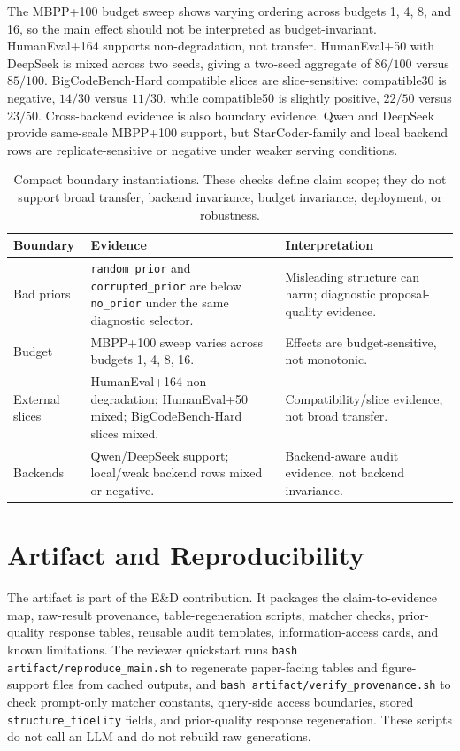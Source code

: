 \documentclass{article}
\newcommand{\code}[1]{\texttt{#1}}
\begin{document}
The MBPP+100 budget sweep shows varying ordering across budgets 1, 4, 8, and 16, so the main effect should not be interpreted as budget-invariant. HumanEval+164 supports non-degradation, not transfer. HumanEval+50 with DeepSeek is mixed across two seeds, giving a two-seed aggregate of $86/100$ versus $85/100$. BigCodeBench-Hard compatible slices are slice-sensitive: compatible30 is negative, $14/30$ versus $11/30$, while compatible50 is slightly positive, $22/50$ versus $23/50$. Cross-backend evidence is also boundary evidence. Qwen and DeepSeek provide same-scale MBPP+100 support, but StarCoder-family and local backend rows are replicate-sensitive or negative under weaker serving conditions.

\begin{table}[H]
\caption{Compact boundary instantiations. These checks define claim scope; they do not support broad transfer, backend invariance, budget invariance, deployment, or robustness.}
\label{tab:boundaries}
\centering
\footnotesize
\begin{tabularx}{\linewidth}{l Y Y}
\toprule
Boundary & Evidence & Interpretation \\
\midrule
Bad priors & \code{random\_prior} and \code{corrupted\_prior} are below \code{no\_prior} under the same diagnostic selector. & Misleading structure can harm; diagnostic proposal-quality evidence. \\
Budget & MBPP+100 sweep varies across budgets 1, 4, 8, 16. & Effects are budget-sensitive, not monotonic. \\
External slices & HumanEval+164 non-degradation; HumanEval+50 mixed; BigCodeBench-Hard slices mixed. & Compatibility/slice evidence, not broad transfer. \\
Backends & Qwen/DeepSeek support; local/weak backend rows mixed or negative. & Backend-aware audit evidence, not backend invariance. \\
\bottomrule
\end{tabularx}
\end{table}

\section{Artifact and Reproducibility}
The artifact is part of the E\&D contribution. It packages the claim-to-evidence map, raw-result provenance, table-regeneration scripts, matcher checks, prior-quality response tables, reusable audit templates, information-access cards, and known limitations. The reviewer quickstart runs \code{bash artifact/reproduce\_main.sh} to regenerate paper-facing tables and figure-support files from cached outputs, and \code{bash artifact/verify\_provenance.sh} to check prompt-only matcher constants, query-side access boundaries, stored \code{structure\_fidelity} fields, and prior-quality response regeneration. These scripts do not call an LLM and do not rebuild raw generations.
\end{document}
